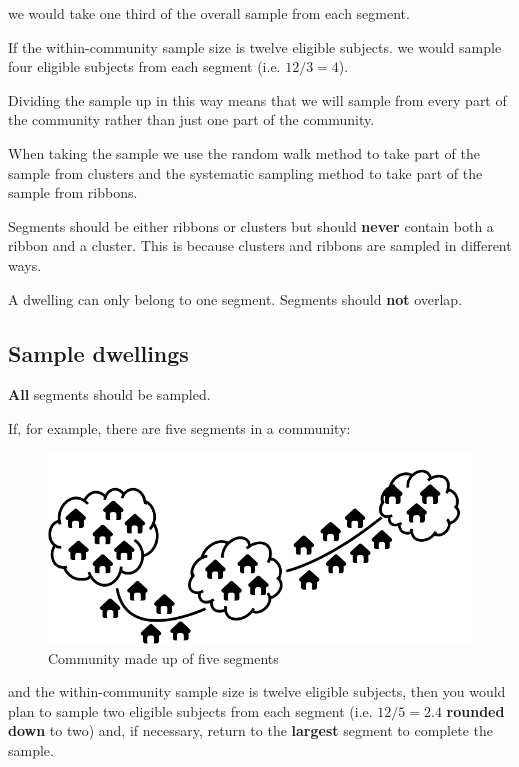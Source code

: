 \documentclass[12pt,a4paper]{book}
\theoremstyle{definition}
\theoremstyle{definition}
\theoremstyle{definition}
\theoremstyle{remark}
\begin{document}
we would take one third of the overall sample from each segment.

If the within-community sample size is twelve eligible subjects. we
would sample four eligible subjects from each segment (i.e.
\(12 / 3 = 4\)).

Dividing the sample up in this way means that we will sample from every
part of the community rather than just one part of the community.

When taking the sample we use the random walk method to take part of the
sample from clusters and the systematic sampling method to take part of
the sample from ribbons.

Segments should be either ribbons or clusters but should \textbf{never}
contain both a ribbon and a cluster. This is because clusters and
ribbons are sampled in different ways.

A dwelling can only belong to one segment. Segments should \textbf{not}
overlap.

\hypertarget{sample-dwellings}{%
\subsection{Sample dwellings}\label{sample-dwellings}}

\textbf{All} segments should be sampled.

If, for example, there are five segments in a community:

\begin{figure}[H]

{\centering \includegraphics{figures/stage2sample7} 

}

\caption{Community made up of five segments}\label{fig:sample21}
\end{figure}

and the within-community sample size is twelve eligible subjects, then
you would plan to sample two eligible subjects from each segment (i.e.
\(12 / 5 = 2.4\) \textbf{rounded down} to two) and, if necessary, return
to the \textbf{largest} segment to complete the sample.
\end{document}
